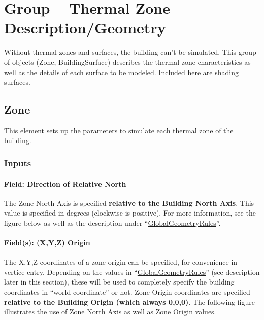 \section{Group -- Thermal Zone Description/Geometry}\label{group-thermal-zone-descriptiongeometry}

Without thermal zones and surfaces, the building can't be simulated. This group of objects (Zone, BuildingSurface) describes the thermal zone characteristics as well as the details of each surface to be modeled. Included here are shading surfaces.

\subsection{Zone}\label{zone}

This element sets up the parameters to simulate each thermal zone of the building.

\subsubsection{Inputs}\label{inputs-048}

\paragraph{Field: Direction of Relative North}\label{field-direction-of-relative-north}

The Zone North Axis is specified \textbf{relative to the Building North Axis}. This value is specified in degrees (clockwise is positive). For more information, see the figure below as well as the description under ``\hyperref[globalgeometryrules]{GlobalGeometryRules}''.

\paragraph{Field(s): (X,Y,Z) Origin}\label{fields-xyz-origin}

The X,Y,Z coordinates of a zone origin can be specified, for convenience in vertice entry. Depending on the values in ``\hyperref[globalgeometryrules]{GlobalGeometryRules}'' (see description later in this section), these will be used to completely specify the building coordinates in ``world coordinate'' or not. Zone Origin coordinates are specified \textbf{relative to the Building Origin (which always 0,0,0)}. The following figure illustrates the use of Zone North Axis as well as Zone Origin values.

